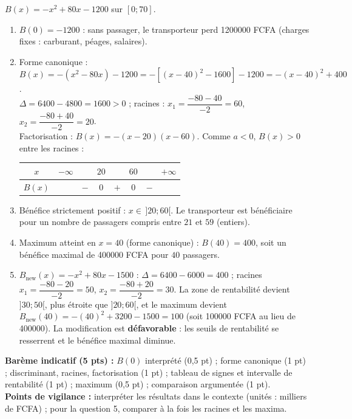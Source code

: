 \documentclass[11pt]{article}
\begin{document}
\begin{corrige}
$B(x)=-x^2+80x-1200$ sur $[0;70]$.
\begin{enumerate}
    \item $B(0)=-1200$ : sans passager, le transporteur perd \num{1200000} FCFA (charges fixes : carburant, péages, salaires).
    \item Forme canonique : $B(x)=-\left(x^2-80x\right)-1200=-\left[(x-40)^2-1600\right]-1200=-(x-40)^2+400$.\\
    $\Delta=6400-4800=1600>0$ ; racines : $x_1=\dfrac{-80-40}{-2}=60$, $x_2=\dfrac{-80+40}{-2}=20$.\\
    Factorisation : $B(x)=-(x-20)(x-60)$. Comme $a<0$, $B(x)>0$ entre les racines :
    \begin{center}
    \begin{tabular}{|c|ccccccc|}\hline
    $x$ & $-\infty$ & & $20$ & & $60$ & & $+\infty$ \\ \hline
    $B(x)$ & & $-$ & $0$ & $+$ & $0$ & $-$ & \\ \hline
    \end{tabular}
    \end{center}
    \item Bénéfice strictement positif : $x\in\,]20;60[$. Le transporteur est bénéficiaire pour un nombre de passagers compris entre $21$ et $59$ (entiers).
    \item Maximum atteint en $x=40$ (forme canonique) : $B(40)=400$, soit un bénéfice maximal de \num{400000} FCFA pour $40$ passagers.
    \item $B_{\text{new}}(x)=-x^2+80x-1500$ : $\Delta=6400-6000=400$ ; racines $x_1=\dfrac{-80-20}{-2}=50$, $x_2=\dfrac{-80+20}{-2}=30$. La zone de rentabilité devient $]30;50[$, plus étroite que $]20;60[$, et le maximum devient $B_{\text{new}}(40)=-(40)^2+3200-1500=100$ (soit \num{100000} FCFA au lieu de \num{400000}). La modification est \textbf{défavorable} : les seuils de rentabilité se resserrent et le bénéfice maximal diminue.
\end{enumerate}
\textbf{Barème indicatif (5 pts) :} $B(0)$ interprété (0,5 pt) ; forme canonique (1 pt) ; discriminant, racines, factorisation (1 pt) ; tableau de signes et intervalle de rentabilité (1 pt) ; maximum (0,5 pt) ; comparaison argumentée (1 pt).\\
\textbf{Points de vigilance :} interpréter les résultats dans le contexte (unités : milliers de FCFA) ; pour la question 5, comparer à la fois les racines et les maxima.
\end{corrige}
\end{document}
